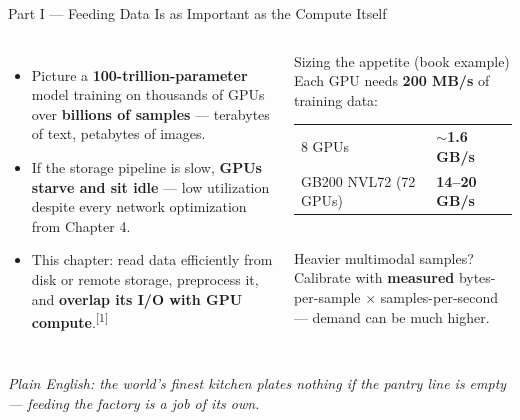 \documentclass[aspectratio=169]{beamer}
\newcommand{\kw}[1]{\textbf{\textcolor{kwblue}{#1}}}
\newcommand{\pe}[1]{\par{\setlength{\fboxsep}{2.5pt}\noindent\colorbox{navy!9}{\parbox{\dimexpr\textwidth-5pt\relax}{\footnotesize\itshape Plain English: #1}}}}
\newcommand{\refmark}[1]{\textsuperscript{[#1]}}
\begin{document}
\begin{frame}{Part I --- Feeding Data Is as Important as the Compute Itself}
  \begin{columns}[c]
    \begin{itemize}
      \item Picture a \kw{100-trillion-parameter} model training on thousands of GPUs over
            \kw{billions of samples} --- terabytes of text, petabytes of images.
      \item If the storage pipeline is slow, \kw{GPUs starve and sit idle} --- low utilization
            despite every network optimization from Chapter 4.
      \item This chapter: read data efficiently from disk or remote storage, preprocess it,
            and \kw{overlap its I/O with GPU compute}.\refmark{1}
    \end{itemize}
    \begin{block}{Sizing the appetite (book example)}
      \small Each GPU needs \kw{200 MB/s} of training data:\\[2pt]
      {\small\setlength{\tabcolsep}{4pt}
      \begin{tabular}{@{}ll@{}}
        \toprule
        8 GPUs & $\sim$\kw{1.6 GB/s} \\
        GB200 NVL72 (72 GPUs) & \kw{14--20 GB/s} \\
        \bottomrule
      \end{tabular}}\\[3pt]
      \footnotesize Heavier multimodal samples? Calibrate with \kw{measured}
      bytes-per-sample $\times$ samples-per-second --- demand can be much higher.
    \end{block}
  \end{columns}
  \pe{the world's finest kitchen plates nothing if the pantry line is empty --- feeding the factory is a job of its own.}
\end{frame}
\end{document}
